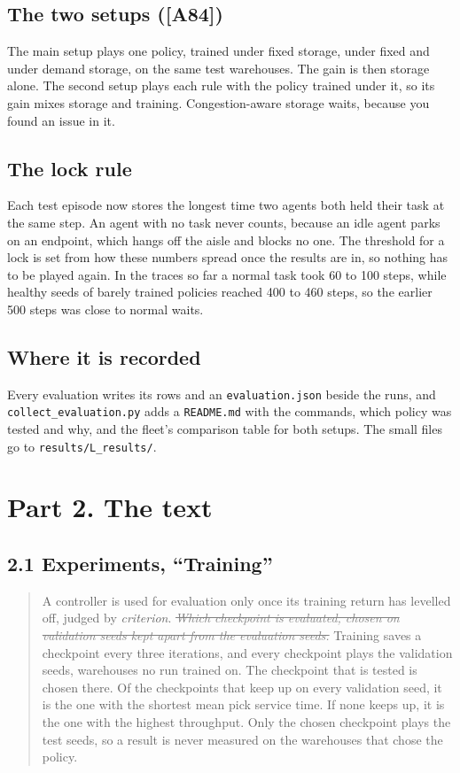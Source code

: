 \documentclass[11pt,a4paper]{article}
\newcommand{\new}[1]{\textcolor{newc}{#1}}
\newcommand{\old}[1]{\textcolor{gray}{\st{#1}}}
\newcommand{\mockup}[1]{\textit{#1}}
\begin{document}
\subsection*{The two setups ([A84])}
The main setup plays one policy, trained under fixed storage, under fixed and
under demand storage, on the same test warehouses. The gain is then storage
alone. The second setup plays each rule with the policy trained under it, so its
gain mixes storage and training. Congestion-aware storage waits, because you
found an issue in it.

\subsection*{The lock rule}
Each test episode now stores the longest time two agents both held their task at
the same step. An agent with no task never counts, because an idle agent parks on
an endpoint, which hangs off the aisle and blocks no one. The threshold for a lock
is set from how these numbers spread once the results are in, so nothing has to
be played again. In the traces so far a normal task took 60 to 100 steps, while
healthy seeds of barely trained policies reached 400 to 460 steps, so the earlier
500 steps was close to normal waits.

\subsection*{Where it is recorded}
Every evaluation writes its rows and an \texttt{evaluation.json} beside the runs,
and \texttt{collect\_evaluation.py} adds a \texttt{README.md} with the commands,
which policy was tested and why, and the fleet's comparison table for both
setups. The small files go to \texttt{results/L\_results/}.

\section*{Part 2. The text}

\subsection*{2.1 Experiments, ``Training''}
\begin{quote}
A controller is used for evaluation only once its training return has
levelled off, judged by \mockup{criterion}. \textit{\old{Which checkpoint is evaluated, chosen on validation seeds kept apart from the evaluation seeds.}}
\new{Training saves a checkpoint every three iterations, and every checkpoint
plays the validation seeds, warehouses no run trained on. The checkpoint that
is tested is chosen there. Of the checkpoints that keep up on every
validation seed, it is the one with the shortest mean pick service time. If
none keeps up, it is the one with the highest throughput. Only the chosen
checkpoint plays the test seeds, so a result is never measured on the
warehouses that chose the policy.}
\end{quote}
\end{document}

